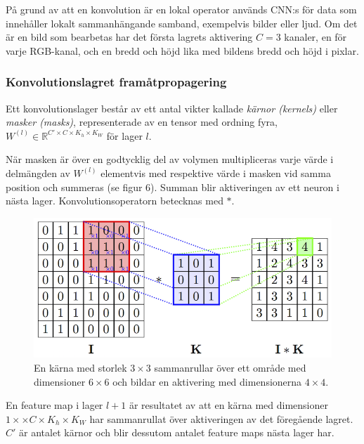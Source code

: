 \documentclass[a4paper,11pt,twoside]{article}
\begin{document}
På grund av att en konvolution är en lokal operator används CNN:s för data som innehåller lokalt sammanhängande samband, exempelvis bilder eller ljud. Om det är en bild som bearbetas har det första lagrets aktivering $C = 3$ kanaler, en för varje RGB-kanal, och en bredd och höjd lika med bildens bredd och höjd i pixlar. \cite{cs231n} \cite{convmath}

\subsubsection{Konvolutionslagret framåtpropagering}
Ett konvolutionslager består av ett antal vikter kallade \textit{kärnor (kernels)} eller \textit{masker (masks)}, representerade av en tensor med ordning fyra, $W^{(l)} \in \mathbb{R}^{C' \times C  \times K_h \times K_W}$ för lager $l$. \cite{cs231n} \cite{convmath}

När masken är över en godtycklig del av volymen multipliceras varje värde i delmängden av $W^{(l)}$ elementvis med respektive värde i masken vid samma position och summeras (se figur 6). Summan blir aktiveringen av ett neuron i nästa lager. Konvolutionsoperatorn betecknas med $*$. \cite{cs231n} \cite{convmath}

\begin{figure}[h]\label{figkonv}
	\centering
  		\includegraphics[scale=2.1]{convolution.png}
  	\caption{En kärna med storlek $3 \times 3$ sammanrullar över ett område med dimensioner $6 \times 6$ och bildar en aktivering med dimensionerna $4 \times 4$. \cite{figkonv}}
\end{figure}

En feature map i lager $l+1$ är resultatet av att en kärna med dimensioner $1 \times \times C  \times K_h \times K_W$ har sammanrullat över aktiveringen av det föregående lagret. $C'$ är antalet kärnor och blir dessutom antalet feature maps nästa lager har. \cite{cs231n} \cite{convmath}
\end{document}
